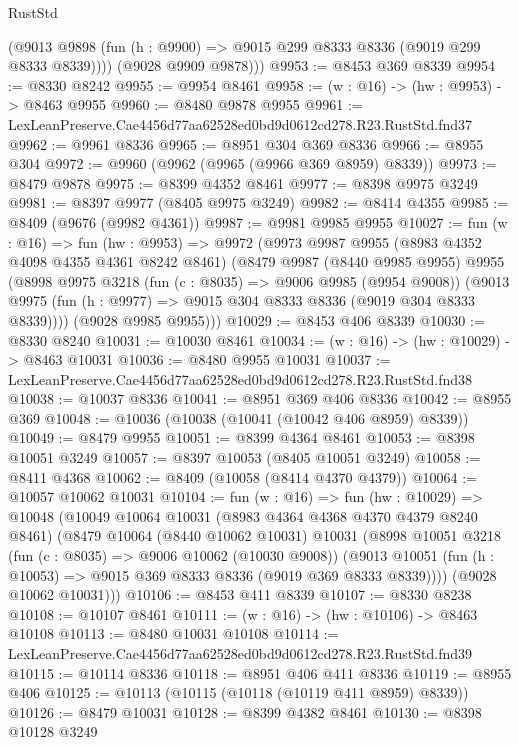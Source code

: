 \begin{lexlean}{RustStd}
\begin{coremodule}
          (@9013 @9898 (fun (h : @9900) => @9015 @299 @8333 @8336 (@9019 @299 @8333 @8339))))
        (@9028 @9909 @9878)))
@9953 := @8453 @369 @8339
@9954 := @8330 @8242
@9955 := @9954 @8461
@9958 := (w : @16) -> (hw : @9953) -> @8463 @9955
@9960 := @8480 @9878 @9955
@9961 := LexLeanPreserve.Cae4456d77aa62528ed0bd9d0612cd278.R23.RustStd.fnd37
@9962 := @9961 @8336
@9965 := @8951 @304 @369 @8336
@9966 := @8955 @304
@9972 := @9960 (@9962 (@9965 (@9966 @369 @8959) @8339))
@9973 := @8479 @9878
@9975 := @8399 @4352 @8461
@9977 := @8398 @9975 @3249
@9981 := @8397 @9977 (@8405 @9975 @3249)
@9982 := @8414 @4355
@9985 := @8409 (@9676 (@9982 @4361))
@9987 := @9981 @9985 @9955
@10027 := fun (w : @16) =>
  fun (hw : @9953) =>
  @9972
    (@9973
      @9987
      @9955
      (@8983 @4352 @4098 @4355 @4361 @8242 @8461)
      (@8479
        @9987
        (@8440 @9985 @9955)
        @9955
        (@8998
          @9975
          @3218
          (fun (c : @8035) => @9006 @9985 (@9954 @9008))
          (@9013 @9975 (fun (h : @9977) => @9015 @304 @8333 @8336 (@9019 @304 @8333 @8339))))
        (@9028 @9985 @9955)))
@10029 := @8453 @406 @8339
@10030 := @8330 @8240
@10031 := @10030 @8461
@10034 := (w : @16) -> (hw : @10029) -> @8463 @10031
@10036 := @8480 @9955 @10031
@10037 := LexLeanPreserve.Cae4456d77aa62528ed0bd9d0612cd278.R23.RustStd.fnd38
@10038 := @10037 @8336
@10041 := @8951 @369 @406 @8336
@10042 := @8955 @369
@10048 := @10036 (@10038 (@10041 (@10042 @406 @8959) @8339))
@10049 := @8479 @9955
@10051 := @8399 @4364 @8461
@10053 := @8398 @10051 @3249
@10057 := @8397 @10053 (@8405 @10051 @3249)
@10058 := @8411 @4368
@10062 := @8409 (@10058 (@8414 @4370 @4379))
@10064 := @10057 @10062 @10031
@10104 := fun (w : @16) =>
  fun (hw : @10029) =>
  @10048
    (@10049
      @10064
      @10031
      (@8983 @4364 @4368 @4370 @4379 @8240 @8461)
      (@8479
        @10064
        (@8440 @10062 @10031)
        @10031
        (@8998
          @10051
          @3218
          (fun (c : @8035) => @9006 @10062 (@10030 @9008))
          (@9013 @10051 (fun (h : @10053) => @9015 @369 @8333 @8336 (@9019 @369 @8333 @8339))))
        (@9028 @10062 @10031)))
@10106 := @8453 @411 @8339
@10107 := @8330 @8238
@10108 := @10107 @8461
@10111 := (w : @16) -> (hw : @10106) -> @8463 @10108
@10113 := @8480 @10031 @10108
@10114 := LexLeanPreserve.Cae4456d77aa62528ed0bd9d0612cd278.R23.RustStd.fnd39
@10115 := @10114 @8336
@10118 := @8951 @406 @411 @8336
@10119 := @8955 @406
@10125 := @10113 (@10115 (@10118 (@10119 @411 @8959) @8339))
@10126 := @8479 @10031
@10128 := @8399 @4382 @8461
@10130 := @8398 @10128 @3249

\end{coremodule}
\end{lexlean}
